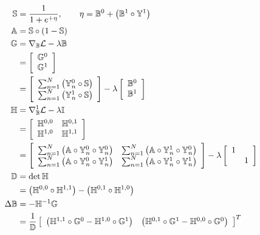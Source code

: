 \begin{align}
\mathbb{S} &= \frac{1}{1+e^{+\eta}},\qquad \eta = \mathbb{B}^0 + \left(\mathbb{B}^1\circ\mathbb{Y}^1\right)\\
\mathbb{A} &= \mathbb{S}\circ\left(1-\mathbb{S}\right)\\
\mathbb{G} &= \nabla_{\mathbb{B}}\mathcal{L} - \lambda\mathbb{B} \nonumber \\
&= \left[\begin{array}{c}
\mathbb{G}^0 \\ \mathbb{G}^1
\end{array}\right] \nonumber \\
&= \left[\begin{array}{c}
\sum_{n=1}^{N}\left( \mathbb{Y}_n^0\circ\mathbb{S} \right) \\
\sum_{n=1}^{N}\left( \mathbb{Y}_n^1\circ\mathbb{S} \right)
\end{array}\right] - \lambda\left[\begin{array}{c} \mathbb{B}^0 \\ \mathbb{B}^1\end{array}\right]\\
\mathbb{H} &= \nabla_{\mathbb{B}}^1\mathcal{L} -\lambda\mathbb{I} \nonumber \\
&= \left[\begin{array}{cc}
\mathbb{H}^{0,0} & \mathbb{H}^{0,1} \\ \mathbb{H}^{1,0} & \mathbb{H}^{1,1}
\end{array}\right] \nonumber \\
&= \left[\begin{array}{cc}
\sum_{n=1}^{N}\left( \mathbb{A}\circ\mathbb{Y}_n^0\circ\mathbb{Y}_n^0 \right) & 
\sum_{n=1}^{N}\left( \mathbb{A}\circ\mathbb{Y}_n^1\circ\mathbb{Y}_n^0 \right) \\
\sum_{n=1}^{N}\left( \mathbb{A}\circ\mathbb{Y}_n^0\circ\mathbb{Y}_n^1 \right) & 
\sum_{n=1}^{N}\left( \mathbb{A}\circ\mathbb{Y}_n^1\circ\mathbb{Y}_n^1 \right)
\end{array}\right] - \lambda\left[\begin{array}{cc} 1 & \\ & 1\end{array}\right]\\
\mathbb{D} &= \det{\mathbb{H}} \nonumber \\
&= \left(\mathbb{H}^{0,0}\circ\mathbb{H}^{1,1}\right) - \left(\mathbb{H}^{0,1}\circ\mathbb{H}^{1,0}\right) \\
\Delta\mathbb{B} &= -\mathbb{H}^{-1}\mathbb{G} \nonumber \\
&= \dfrac{1}{\mathbb{D}} \left[\begin{array}{cc}
\left(\mathbb{H}^{1,1}\circ\mathbb{G}^{0} - \mathbb{H}^{1,0}\circ\mathbb{G}^{1} \right) & 
\left(\mathbb{H}^{0,1}\circ\mathbb{G}^{1} - \mathbb{H}^{0,0}\circ\mathbb{G}^{0} \right)
\end{array}\right]^{T}
\end{align}
